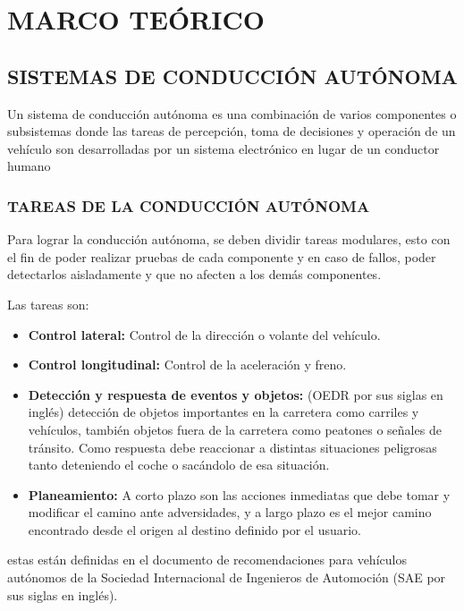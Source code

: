 \chapter{MARCO TEÓRICO}
\section{SISTEMAS DE CONDUCCIÓN AUTÓNOMA}
    Un sistema de conducción autónoma es una combinación de varios componentes o subsistemas donde las tareas de percepción, toma de decisiones y operación de un vehículo son desarrolladas por un sistema electrónico en lugar de un conductor humano
    \subsection{TAREAS DE LA CONDUCCIÓN AUTÓNOMA}
    Para lograr la conducción autónoma, se deben dividir tareas modulares, esto con el fin de poder realizar pruebas de cada componente y en caso de fallos, poder detectarlos aisladamente y que no afecten a los demás componentes.
    
    Las tareas son:
    \begin{itemize}[nosep]
        \item \textbf{Control lateral:} Control de la dirección o volante del vehículo.
        \item \textbf{Control longitudinal:} Control de la aceleración y freno.
        \item \textbf{Detección y respuesta de eventos y objetos:} (OEDR por sus siglas en inglés) detección de objetos importantes en la carretera como carriles y vehículos, también objetos fuera de la carretera como peatones o señales de tránsito. Como respuesta debe reaccionar a distintas situaciones peligrosas tanto deteniendo el coche o sacándolo de esa situación.
        \item \textbf{Planeamiento:} A corto plazo son las acciones inmediatas que debe tomar y modificar el camino ante adversidades, y a largo plazo es el mejor camino encontrado desde el origen al destino definido por el usuario.
    \end{itemize}
    estas están definidas en el documento de recomendaciones para vehículos autónomos de la Sociedad Internacional de Ingenieros de Automoción (SAE por sus siglas en inglés). \citep{J3016_201806}
